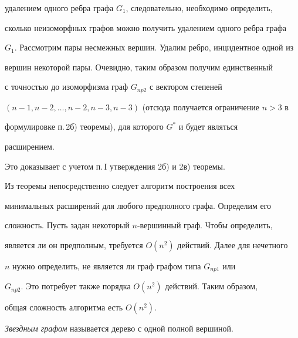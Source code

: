 \begin{pf}
удалением одного ребра графа $G_1$, следовательно, необходимо определить,


сколько неизоморфных графов можно получить удалением одного ребра графа


$G_1$. Рассмотрим пары несмежных вершин. Удалим ребро, инцидентное одной из


вершин некоторой пары. Очевидно, таким образом получим единственный


с точностью до изоморфизма граф $G_{np2}$ с вектором степеней


$(n-1,n-2,\dotsc,n-2,n-3,n-3)$ (отсюда получается ограничение $n > 3$ в


формулировке п.\,2б) теоремы), для которого $G^*$ и будет являться


расширением.





Это доказывает с учетом п.\,I утверждения 2б) и 2в) теоремы.


\end{pf}





\begin{notenonum}


Из теоремы непосредственно следует алгоритм построения всех


минимальных расширений для любого предполного графа. Определим его


сложность. Пусть задан некоторый $n$-вершинный граф. Чтобы определить,


является ли он предполным, требуется $O(n^2)$ действий. Далее для нечетного


$n$ нужно определить, не является ли граф графом типа $G_{np1}$ или


$G_{np2}$. Это потребует также порядка $O(n^2)$ действий. Таким образом,


общая сложность алгоритма есть $O(n^2)$.


\end{notenonum}





\begin{defn}


{\it Звездным графом} называется дерево с одной полной вершиной.


\end{defn}


\addtocounter{cor}{-2}





